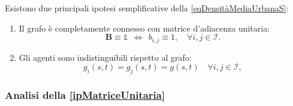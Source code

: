         \begin{ipo}
          Esistono due principali ipotesi semplificative della \ref{eqDensitàMediaUrbanaS}:

          \begin{enumerate}[
            label=S\arabic*,
          ]
            \item\label{ipMatriceUnitaria} Il grafo è completamente connesso con matrice d'adiacenza unitaria:
            \[
              \mathbf B\equiv\mathbb1
              \ \ \iff\ \ 
              b_{i,j}\equiv1,
              \quad\forall i,j\in\mathcal I.
            \]
            \item\label{ipAgentiIndistinguibili} Gli agenti sono indistinguibili rispetto al grafo:
            \[
              g_i(s,t)=g_j(s,t)=g(s,t)
              \quad\forall i,j\in\mathcal I,
            \]
          \end{enumerate}
        \end{ipo}

      \subsubsection{Analisi della \texorpdfstring{\ref{ipMatriceUnitaria}}{S1}}

